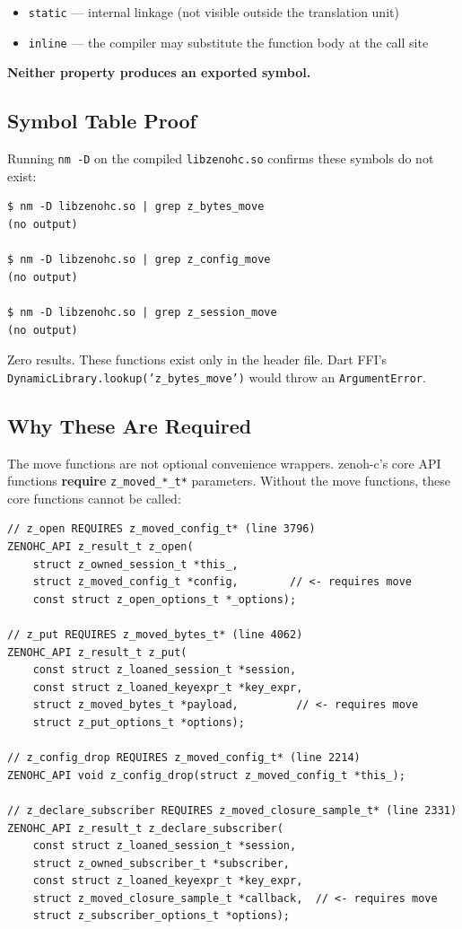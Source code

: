 \documentclass[11pt,a4paper]{article}
\newcommand{\code}[1]{\texttt{#1}}
\newcommand{\fn}[1]{\texttt{#1}}
\newcommand{\type}[1]{\texttt{#1}}
\begin{document}
\begin{itemize}
  \item \code{static} --- internal linkage (not visible outside the
        translation unit)
  \item \code{inline} --- the compiler may substitute the function body at
        the call site
\end{itemize}

\textbf{Neither property produces an exported symbol.}


\subsection{Symbol Table Proof}

Running \code{nm -D} on the compiled \code{libzenohc.so} confirms these
symbols do not exist:

\begin{lstlisting}[style=shellstyle]
$ nm -D libzenohc.so | grep z_bytes_move
(no output)

$ nm -D libzenohc.so | grep z_config_move
(no output)

$ nm -D libzenohc.so | grep z_session_move
(no output)
\end{lstlisting}

Zero results. These functions exist only in the header file. Dart FFI's
\fn{DynamicLibrary.lookup('z\_bytes\_move')} would throw an
\code{ArgumentError}.


\subsection{Why These Are Required}

The move functions are not optional convenience wrappers. zenoh-c's core API
functions \textbf{require} \type{z\_moved\_*\_t*} parameters. Without the
move functions, these core functions cannot be called:

\begin{lstlisting}[style=cstyle,caption={Exported functions requiring moved parameters}]
// z_open REQUIRES z_moved_config_t* (line 3796)
ZENOHC_API z_result_t z_open(
    struct z_owned_session_t *this_,
    struct z_moved_config_t *config,        // <- requires move
    const struct z_open_options_t *_options);

// z_put REQUIRES z_moved_bytes_t* (line 4062)
ZENOHC_API z_result_t z_put(
    const struct z_loaned_session_t *session,
    const struct z_loaned_keyexpr_t *key_expr,
    struct z_moved_bytes_t *payload,         // <- requires move
    struct z_put_options_t *options);

// z_config_drop REQUIRES z_moved_config_t* (line 2214)
ZENOHC_API void z_config_drop(struct z_moved_config_t *this_);

// z_declare_subscriber REQUIRES z_moved_closure_sample_t* (line 2331)
ZENOHC_API z_result_t z_declare_subscriber(
    const struct z_loaned_session_t *session,
    struct z_owned_subscriber_t *subscriber,
    const struct z_loaned_keyexpr_t *key_expr,
    struct z_moved_closure_sample_t *callback,  // <- requires move
    struct z_subscriber_options_t *options);
\end{lstlisting}
\end{document}
